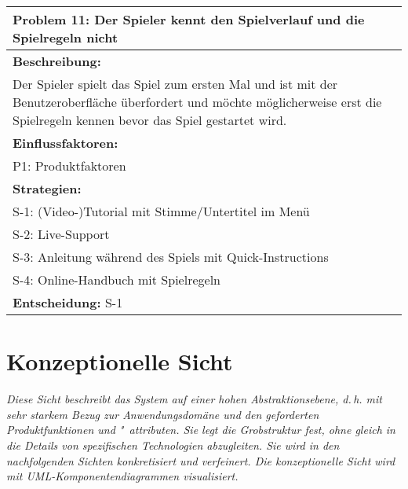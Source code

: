 \documentclass[fontsize=12pt,paper=a4,twoside]{scrartcl}
\begin{document}
\begin{longtable}{|p{15cm}|}
\hline
Problem 11: Der Spieler kennt den Spielverlauf und die Spielregeln nicht                                                                     
\\ \hline                                                                                                                                                                                                                                                                                                                                                                                                                                                                                                                                                        
\textbf{Beschreibung:} \\
Der Spieler spielt das Spiel zum ersten Mal und ist mit der Benutzeroberfläche überfordert und möchte möglicherweise erst die Spielregeln kennen bevor das Spiel gestartet wird.
\\ \hline
\textbf{Einflussfaktoren:} \\
P1: Produktfaktoren
\\ \hline
\textbf{Strategien:} \\
S-1: (Video-)Tutorial mit Stimme/Untertitel im Menü \\
S-2: Live-Support \\
S-3: Anleitung während des Spiels mit Quick-Instructions \\
S-4: Online-Handbuch mit Spielregeln
 \\ \hline
 \textbf{Entscheidung:} S-1
\\ \hline
\end{longtable}

\section{Konzeptionelle Sicht} \label{sec:konzeptionell}

{\itshape Diese Sicht beschreibt das System auf einer hohen Abstraktionsebene,
d.\,h. mit sehr starkem Bezug zur Anwendungsdomäne und den geforderten
Produktfunktionen und "~attributen. Sie legt die Grobstruktur fest, ohne gleich 
in die Details von spezifischen Technologien abzugleiten. Sie wird in den 
nachfolgenden Sichten konkretisiert und verfeinert. Die konzeptionelle Sicht 
wird mit {UML}-Komponentendiagrammen visualisiert.}
\end{document}
